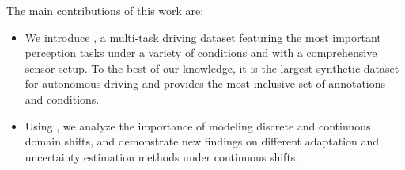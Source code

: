 The main contributions of this work are:
\begin{itemize}[leftmargin=1.25em]
\vspace{-0.5em}
\setlength\itemsep{0em}
    \item We introduce \thedataset{}, a multi-task driving dataset featuring the most important perception tasks under a variety of conditions and with a comprehensive sensor setup.
    To the best of our knowledge, it is the largest synthetic dataset for autonomous driving and provides the most inclusive set of annotations and conditions.
    \item Using \thedataset{}, we analyze the importance of modeling discrete and continuous domain shifts, and demonstrate new findings on different adaptation and uncertainty estimation methods under continuous shifts.
\end{itemize}
